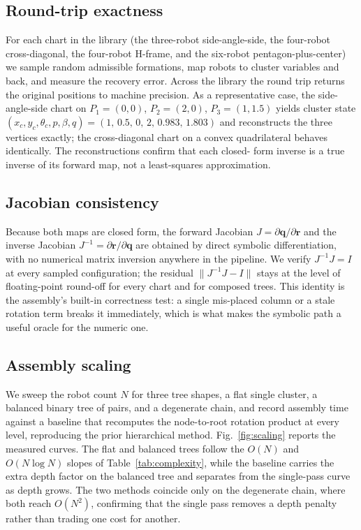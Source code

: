 \documentclass[conference]{IEEEtran}
\newcommand{\rvec}{\mathbf{r}}
\newcommand{\qvec}{\mathbf{q}}
\newcommand{\Jinv}{J^{-1}}
\begin{document}
\subsection{Round-trip exactness}
For each chart in the library (the three-robot side-angle-side, the four-robot
cross-diagonal, the four-robot H-frame, and the six-robot pentagon-plus-center)
we sample random admissible formations, map robots to cluster variables and back,
and measure the recovery error. Across the library the round trip returns the
original positions to machine precision. As a representative case, the
side-angle-side chart on $P_1=(0,0)$, $P_2=(2,0)$, $P_3=(1,1.5)$ yields cluster
state $(x_c,y_c,\theta_c,p,\beta,q) = (1,\,0.5,\,0,\,2,\,0.983,\,1.803)$ and
reconstructs the three vertices exactly; the cross-diagonal chart on a convex
quadrilateral behaves identically. The reconstructions confirm that each closed-
form inverse is a true inverse of its forward map, not a least-squares
approximation.

\subsection{Jacobian consistency}
Because both maps are closed form, the forward Jacobian $J = \partial \qvec /
\partial \rvec$ and the inverse Jacobian $\Jinv = \partial \rvec / \partial \qvec$
are obtained by direct symbolic differentiation, with no numerical matrix
inversion anywhere in the pipeline. We verify $\Jinv J = I$ at every sampled
configuration; the residual $\lVert \Jinv J - I \rVert$ stays at the level of
floating-point round-off for every chart and for composed trees. This identity is
the assembly's built-in correctness test: a single mis-placed column or a stale
rotation term breaks it immediately, which is what makes the symbolic path a
useful oracle for the numeric one.

\subsection{Assembly scaling}
We sweep the robot count $N$ for three tree shapes, a flat single cluster, a
balanced binary tree of pairs, and a degenerate chain, and record assembly time
against a baseline that recomputes the node-to-root rotation product at every
level, reproducing the prior hierarchical method. Fig.~\ref{fig:scaling} reports
the measured curves. The flat and balanced trees follow the $O(N)$ and
$O(N \log N)$ slopes of Table~\ref{tab:complexity}, while the baseline carries the
extra depth factor on the balanced tree and separates from the single-pass curve
as depth grows. The two methods coincide only on the degenerate chain, where both
reach $O(N^2)$, confirming that the single pass removes a depth penalty rather
than trading one cost for another.
\end{document}
